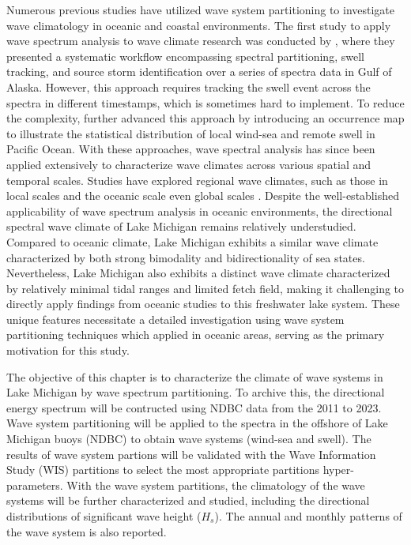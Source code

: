 Numerous previous studies have utilized wave system partitioning to investigate
wave climatology in oceanic and coastal environments. The first study to apply
wave spectrum analysis to wave climate research was conducted by
\citet{hanson_automated_2001}, where they presented a systematic workflow
encompassing spectral partitioning, swell tracking, and source storm
identification over a series of spectra data in Gulf of Alaska. However, this
approach requires tracking the swell event across the spectra in different
timestamps, which is sometimes hard to implement. To reduce the complexity,
\citet{portilla-yandun_wave_2015,portilla-yandun_climate_2016} further advanced
this approach by introducing an occurrence map to illustrate the statistical
distribution of local wind-sea and remote swell in Pacific Ocean. With these
approaches, wave spectral analysis has since been applied extensively to
characterize wave climates across various spatial and temporal scales. Studies
have explored regional wave climates, such as those in local scales
\citep{romano-moreno_multimodal_2023,venolia_historical_2024,zheng_investigation_2024}
and the oceanic scale
\citep{jiang_wave_2019,langodan_unraveling_2018,portilla-yandun_climate_2016}
even global scales \citep{echevarria_seasonal_2019,echevarria_influence_2020}.
Despite the well-established applicability of wave spectrum analysis in oceanic
environments, the directional spectral wave climate of Lake Michigan remains
relatively understudied. Compared to oceanic climate, Lake Michigan exhibits a
similar wave climate characterized by both strong bimodality and
bidirectionality of sea states. Nevertheless, Lake Michigan also exhibits a
distinct wave climate characterized by relatively minimal tidal ranges and
limited fetch field, making it challenging to directly apply findings from
oceanic studies to this freshwater lake system. These unique features
necessitate a detailed investigation using wave system partitioning techniques
which applied in oceanic areas, serving as the primary motivation for this
study.

The objective of this chapter is to characterize the climate of wave systems in
Lake Michigan by wave spectrum partitioning. To archive this, the directional
energy spectrum will be contructed using NDBC data from the 2011 to 2023. Wave
system partitioning will be applied to the spectra in the offshore of Lake
Michigan buoys (NDBC) to obtain wave systems (wind-sea and swell). The results
of wave system partions will be validated with the Wave Information Study (WIS)
partitions to select the most appropriate partitions hyper-parameters. With the
wave system partitions, the climatology of the wave systems will be further
characterized and studied, including the directional distributions of
significant wave height ($H_s$). The annual and monthly patterns of the wave
system is also reported. 
